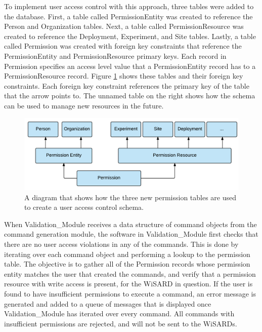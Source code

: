To implement user access control with this approach, three tables were added to the database. First, a table called PermissionEntity was created to reference the Person and Organization tables. Next, a table called PermissionResource was created to reference the Deployment, Experiment, and Site tables. Lastly, a table called Permission was created with foreign key constraints that reference the PermissionEntity and PermissionResource primary keys. Each record in Permission specifies an access level value that a PermissionEntity record has to a PermissionResource record. Figure \ref{fig:uac_simplified} shows these tables and their foreign key constraints. Each foreign key constraint references the primary key of the table that the arrow points to. The unnamed table on the right shows how the schema can be used to manage new resources in the future.

\begin{figure}[H]
	\centering
	\includegraphics[width=\textwidth]{figures/uac_simplified.png}
	\caption{A diagram that shows how the three new permission tables are used to create a user access control schema.}
	\label{fig:uac_simplified}
\end{figure}

When Validation\_Module receives a data structure of command objects from the command generation module, the software in Validation\_Module first checks that there are no user access violations in any of the commands. This is done by iterating over each command object and performing a lookup to the permission table. The objective is to gather all of the Permission records whose permission entity matches the user that created the commands, and verify that a permission resource with write access is present, for the WiSARD in question. If the user is found to have insufficient permissions to execute a command, an error message is generated and added to a queue of messages that is displayed once Validation\_Module has iterated over every command. All commands with insufficient permissions are rejected, and will not be sent to the WiSARDs.

